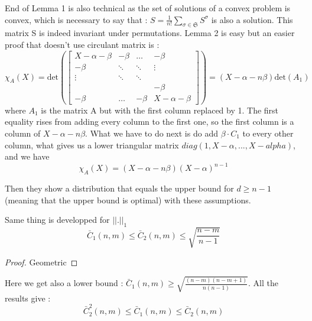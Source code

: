 \documentclass{amsart}
\begin{document}
End of Lemma 1 is also technical as the set of solutions of a convex problem is convex, which is necessary to say that : $S=\frac{1}{n!}\sum_{\sigma\in\mathfrak{S}}S^\sigma$ is also a solution. This matrix S is indeed invariant under permutations. Lemma 2 is easy but an easier proof that doesn't use circulant matrix is : 
$$\chi_A(X)=\text{det}(\begin{bmatrix}
    X- \alpha - \beta & -\beta&\hdots&-\beta \\
    -\beta & \ddots &\ddots&\vdots \\
    \vdots &\ddots &\ddots&   \\
    &&&-\beta\\
    -\beta&\hdots&-\beta&X-\alpha-\beta
\end{bmatrix})=(X-\alpha-n\beta)\text{det}(A_1)$$
where $A_1$ is the matrix A but with the first column replaced by 1. The first equality rises from adding every column to the first one, so the first column is a column of $X-\alpha-n\beta$. What we have to do next is do add $\beta\cdot C_1$ to every other column, what gives us a lower triangular matrix $diag(1,X-\alpha,...,X-alpha)$, and we have $$
\chi_A(X)=(X-\alpha-n\beta)(X-\alpha)^{n-1}$$

Then they show a distribution that equals the upper bound for $d\geq n-1$(meaning that the upper bound is optimal) with these assumptions.

Same thing is developped for $||.||_1$
$$
\bar{C}_1(n,m)\leq\bar{C}_2(n,m) \leq\sqrt{\frac{n-m}{n-1}}
$$
\begin{proof}
    Geometric
\end{proof}
Here we get also a lower bound : $\bar{C}_1(n,m)\geq\sqrt{\frac{(n-m)(n-m+1)}{n(n-1)}}$.
All the results give : $$\bar{C}_2^2(n,m)\leq \bar{C}_1(n,m)\leq\bar{C}_2(n,m)$$
\end{document}
